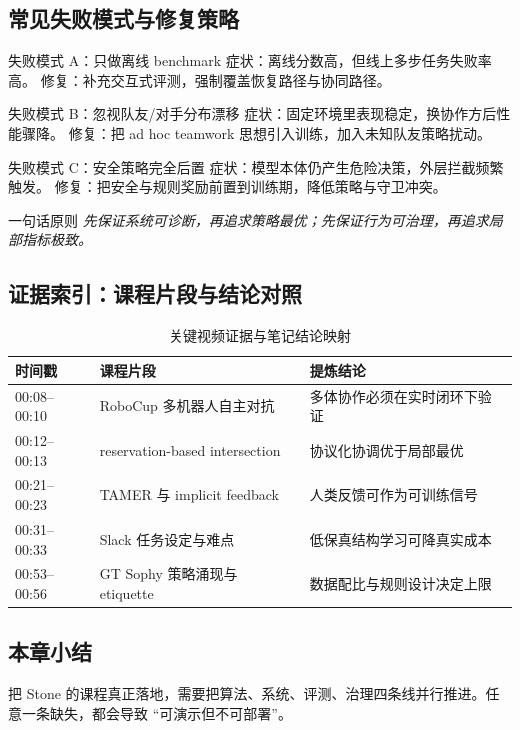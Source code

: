 \documentclass[a4paper]{article}
\begin{document}
\subsection{常见失败模式与修复策略}
\begin{knowledgebox}{失败模式 A：只做离线 benchmark}
症状：离线分数高，但线上多步任务失败率高。
修复：补充交互式评测，强制覆盖恢复路径与协同路径。
\end{knowledgebox}

\begin{knowledgebox}{失败模式 B：忽视队友/对手分布漂移}
症状：固定环境里表现稳定，换协作方后性能骤降。
修复：把 ad hoc teamwork 思想引入训练，加入未知队友策略扰动。
\end{knowledgebox}

\begin{knowledgebox}{失败模式 C：安全策略完全后置}
症状：模型本体仍产生危险决策，外层拦截频繁触发。
修复：把安全与规则奖励前置到训练期，降低策略与守卫冲突。
\end{knowledgebox}

\begin{importantbox}{一句话原则}
\textit{先保证系统可诊断，再追求策略最优；先保证行为可治理，再追求局部指标极致。}
\end{importantbox}

\subsection{证据索引：课程片段与结论对照}
\begin{table}[H]
\centering
\begin{tabular}{p{2.6cm}p{4.9cm}p{4.1cm}}
\toprule
\textbf{时间戳} & \textbf{课程片段} & \textbf{提炼结论} \\
\midrule
00:08--00:10 & RoboCup 多机器人自主对抗 & 多体协作必须在实时闭环下验证 \\
00:12--00:13 & reservation-based intersection & 协议化协调优于局部最优 \\
00:21--00:23 & TAMER 与 implicit feedback & 人类反馈可作为可训练信号 \\
00:31--00:33 & Slack 任务设定与难点 & 低保真结构学习可降真实成本 \\
00:53--00:56 & GT Sophy 策略涌现与 etiquette & 数据配比与规则设计决定上限 \\
\bottomrule
\end{tabular}
\caption{关键视频证据与笔记结论映射}
\end{table}

\subsection{本章小结}
把 Stone 的课程真正落地，需要把算法、系统、评测、治理四条线并行推进。任意一条缺失，都会导致 ``可演示但不可部署''。
\end{document}
